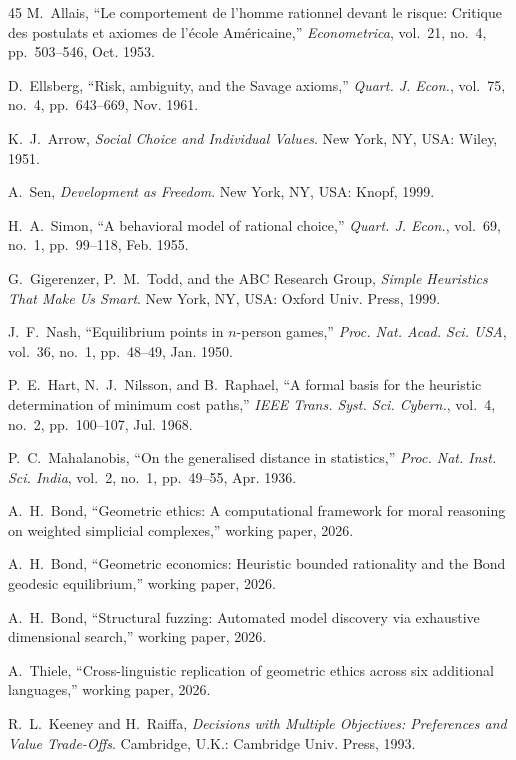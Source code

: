 \documentclass[journal]{IEEEtran}
\begin{document}
\begin{thebibliography}{45}
M.~Allais, ``Le comportement de l'homme rationnel devant le risque: Critique des postulats et axiomes de l'\'{e}cole Am\'{e}ricaine,''
\emph{Econometrica}, vol.~21, no.~4, pp.~503--546, Oct. 1953.

D.~Ellsberg, ``Risk, ambiguity, and the Savage axioms,''
\emph{Quart. J. Econ.}, vol.~75, no.~4, pp.~643--669, Nov. 1961.

K.~J.~Arrow, \emph{Social Choice and Individual Values}.
New York, NY, USA: Wiley, 1951.

A.~Sen, \emph{Development as Freedom}.
New York, NY, USA: Knopf, 1999.

H.~A.~Simon, ``A behavioral model of rational choice,''
\emph{Quart. J. Econ.}, vol.~69, no.~1, pp.~99--118, Feb. 1955.

G.~Gigerenzer, P.~M.~Todd, and the ABC Research Group, \emph{Simple Heuristics That Make Us Smart}.
New York, NY, USA: Oxford Univ. Press, 1999.

J.~F.~Nash, ``Equilibrium points in $n$-person games,''
\emph{Proc. Nat. Acad. Sci. USA}, vol.~36, no.~1, pp.~48--49, Jan. 1950.

P.~E.~Hart, N.~J.~Nilsson, and B.~Raphael, ``A formal basis for the heuristic determination of minimum cost paths,''
\emph{IEEE Trans. Syst. Sci. Cybern.}, vol.~4, no.~2, pp.~100--107, Jul. 1968.

P.~C.~Mahalanobis, ``On the generalised distance in statistics,''
\emph{Proc. Nat. Inst. Sci. India}, vol.~2, no.~1, pp.~49--55, Apr. 1936.

A.~H.~Bond, ``Geometric ethics: A computational framework for moral reasoning on weighted simplicial complexes,''
working paper, 2026.

A.~H.~Bond, ``Geometric economics: Heuristic bounded rationality and the Bond geodesic equilibrium,''
working paper, 2026.

A.~H.~Bond, ``Structural fuzzing: Automated model discovery via exhaustive dimensional search,''
working paper, 2026.

A.~Thiele, ``Cross-linguistic replication of geometric ethics across six additional languages,''
working paper, 2026.

R.~L.~Keeney and H.~Raiffa, \emph{Decisions with Multiple Objectives: Preferences and Value Trade-Offs}.
Cambridge, U.K.: Cambridge Univ. Press, 1993.


\end{thebibliography}
\end{document}
